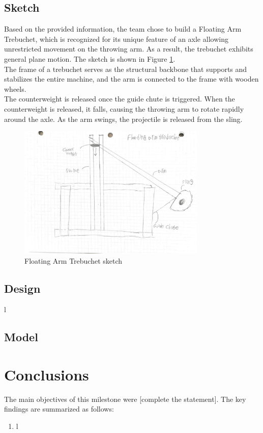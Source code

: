 \documentclass[12pt, titlepage]{article}
\begin{document}
    \subsection{Sketch}
    Based on the provided information, the team chose to build a Floating Arm 
    Trebuchet, which is recognized for its unique feature of an axle allowing 
    unrestricted movement on the throwing arm. As a result, the trebuchet 
    exhibits general plane motion. The sketch is shown in Figure \ref{sketch}.\\[10pt]
    The frame of a trebuchet serves as the structural backbone that supports 
    and stabilizes the entire machine, and the arm is connected to the frame
    with wooden wheels.\\[10pt]
    The counterweight is released once the guide chute is triggered.
    When the counterweight is released, it falls, causing the throwing arm 
    to rotate rapidly around the axle. As the arm swings, the projectile 
    is released from the sling.
    \begin{figure}[t]                                  
    \centering
    \includegraphics[width=0.8\textwidth]{sketch.jpeg}
    \caption{Floating Arm Trebuchet sketch\label{sketch}}
    \end{figure}
    \newpage
    \subsection{Design}
    l
    \newpage
    \subsection{Model}
    \newpage
    \section{Conclusions}
    The main objectives of this milestone were [complete the statement].
    The key findings are summarized as follows:
    \begin{enumerate}
        \item l
    \end{enumerate}
    \newpage
\end{document}
